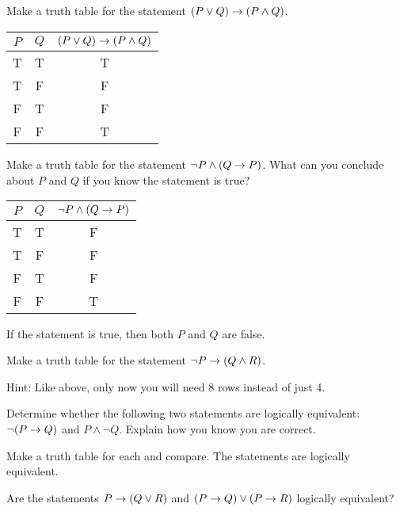 
\begin{questions}
\question Make a truth table for the statement $(P \vee Q) \rightarrow (P \wedge Q)$. 

\begin{answer}
 \begin{tabular}{c|c|c}
             $P$ & $Q$ & $(P \vee Q) \rightarrow (P \wedge Q)$\\ \hline
             T & T & T \\
             T & F & F \\
             F & T & F \\
             F & F & T
          \end{tabular}
\end{answer}


\question Make a truth table for the statement $\neg P \wedge (Q \rightarrow P)$.  What can you conclude about $P$ and $Q$ if you know the statement is true?

    \begin{answer}
      \begin{tabular}{c|c|c}
             $P$ & $Q$ & $\neg P \wedge (Q \rightarrow P)$\\ \hline
             T & T & F \\
             T & F & F \\
             F & T & F \\
             F & F & T
          \end{tabular}
	If the statement is true, then both $P$ and $Q$ are false.
    \end{answer}


\question Make a truth table for the statement $\neg P \rightarrow (Q \wedge R)$.

  \begin{answer}
    Hint: Like above, only now you will need 8 rows instead of just 4.
  \end{answer}


\question Determine whether the following two statements are logically equivalent: $\neg(P \rightarrow Q)$ and $P \wedge \neg Q$.  Explain how you know you are correct.

  \begin{answer}
    Make a truth table for each and compare.  The statements are logically equivalent.
  \end{answer}

  
  

\question Are the statements $P \rightarrow (Q\vee R)$ and $(P \rightarrow Q) \vee (P \rightarrow R)$ logically equivalent?


\end{questions}
